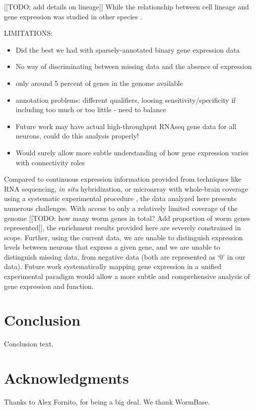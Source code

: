 \documentclass[10pt,letterpaper]{article}
\begin{document}
[[TODO: add details on lineage]] While the relationship between cell lineage and gene expression was studied in other species \citep{Cui2007, Kluger2004}.

LIMITATIONS:
\begin{itemize}
    \item Did the best we had with sparsely-annotated binary gene expression data
    \item No way of discriminating between missing data and the absence of expression
    \item only around 5 percent of genes in the genome available
    \item annotation problems: different qualifiers, loosing sensitivity/specificity if including too much or too little - need to balance
    \item Future work may have actual high-throughput RNAseq gene data for all neurons, could do this analysis properly!
    \item Would surely allow more subtle understanding of how gene expression varies with connectivity roles
\end{itemize}

Compared to continuous expression information provided from techniques like RNA sequencing, \emph{in situ} hybridization, or microarray with whole-brain coverage using a systematic experimental procedure \cite{Lein:2007jn, Shen:2012ua, Tasic:2016jp}, the data analyzed here presents numerous challenges.
With access to only a relatively limited coverage of the genome [[TODO: how many worm genes in total? Add proportion of worm genes represented]], the enrichment results provided here are severely constrained in scope.
Further, using the current data, we are unable to distinguish expression levels between neurons that express a given gene, and we are unable to distinguish missing data, from negative data (both are represented as `0' in our data).
Future work systematically mapping gene expression in a unified experimental paradigm would allow a more subtle and comprehensive analysis of gene expression and function.


\section*{Conclusion}

Conclusion text.

\section*{Acknowledgments}
Thanks to Alex Fornito, for being a big deal.
We thank WormBase.
\end{document}
